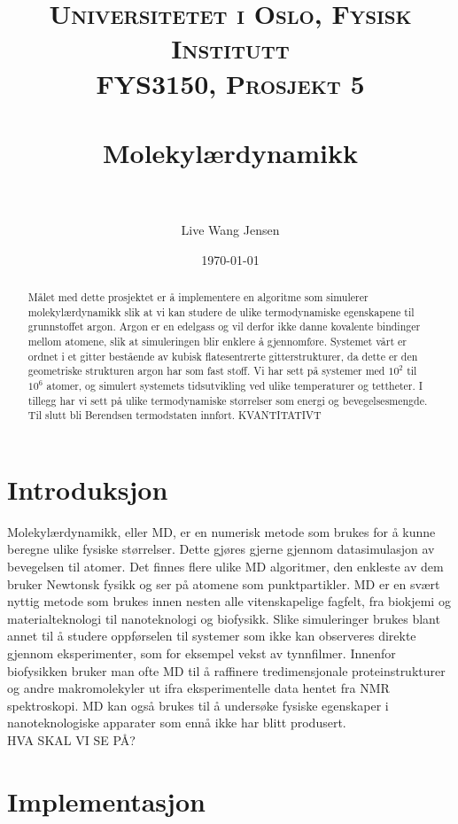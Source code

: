 \documentclass[paper=a4, fontsize=11pt]{scrartcl} %
\title{	
\normalfont \normalsize 
\textsc{Universitetet i Oslo, Fysisk Institutt \\
										FYS3150, Prosjekt 5} \\ [25pt] %
\horrule{0.5pt} \\[0.4cm] %
\huge Molekylærdynamikk \\ %
\horrule{2pt} \\[0.5cm] %
}
\author{Live Wang Jensen} %
\date{\normalsize\today} %
\numberwithin{equation}{section} %
\numberwithin{figure}{section} %
\numberwithin{table}{section} %
\begin{document}
\maketitle 
\begin{abstract}
Målet med dette prosjektet er å implementere en algoritme som simulerer molekylærdynamikk slik at vi kan studere de ulike termodynamiske egenskapene til grunnstoffet argon. Argon er en edelgass og vil derfor ikke danne kovalente bindinger mellom atomene, slik at simuleringen blir enklere å gjennomføre. Systemet vårt er ordnet i et gitter bestående av kubisk flatesentrerte gitterstrukturer, da dette er den geometriske strukturen argon har som fast stoff. Vi har sett på systemer med $10^2$ til $10^6$ atomer, og simulert systemets tidsutvikling ved ulike temperaturer og tettheter. I tillegg har vi sett på ulike termodynamiske størrelser som energi og bevegelsesmengde. Til slutt bli Berendsen termodstaten innført.
KVANTITATIVT

\end{abstract}

\tableofcontents


\section{Introduksjon}
Molekylærdynamikk, eller MD, er en numerisk metode som brukes for å kunne beregne ulike fysiske størrelser. Dette gjøres gjerne gjennom datasimulasjon av bevegelsen til atomer. Det finnes flere ulike MD algoritmer, den enkleste av dem bruker Newtonsk fysikk og ser på atomene som punktpartikler. MD er en svært nyttig metode som brukes innen nesten alle vitenskapelige fagfelt, fra biokjemi og materialteknologi til nanoteknologi og biofysikk. Slike simuleringer brukes blant annet til å studere oppførselen til systemer som ikke kan observeres direkte gjennom eksperimenter, som for eksempel vekst av tynnfilmer. Innenfor biofysikken bruker man ofte MD til å raffinere tredimensjonale proteinstrukturer og andre makromolekyler ut ifra eksperimentelle data hentet fra NMR spektroskopi. MD kan også brukes til å undersøke fysiske egenskaper i nanoteknologiske apparater som ennå ikke har blitt produsert. 
\\
HVA SKAL VI SE PÅ?




\section{Implementasjon}
\end{document}
